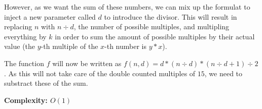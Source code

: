\documentclass[12pt,notitlepage]{article}
\begin{document}
  However, as we want the sum of these numbers, we can mix
  up the formulat to inject a new parameter called $d$ to introduce the divisor. This will result
  in replacing $n$ with $n \div d$, the number of possible multiples, and multipling everything by $k$ in order to sum the amount of
  possible multiples by their actual value (the $y$-th multiple of the $x$-th number is $y * x$).\par

  The function $f$ will now be written as $f(n, d) = d * (n \div d) * (n \div d + 1) \div 2$. As this
  will not take care of the double counted multiples of $15$, we need to substract these of the sum.\par

  \textbf{Complexity: $O(1)$}
\end{document}
